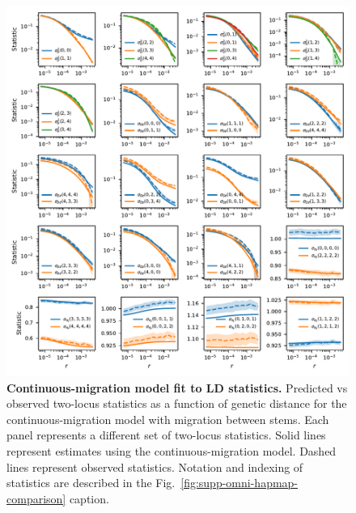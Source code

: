 \documentclass[]{article}
\begin{document}
\begin{figure}[ht]
    \centering
    \includegraphics{figures/supp-continuous-migration-fits.pdf}
    \caption{
        \textbf{Continuous-migration model fit to LD statistics.}
        Predicted vs observed two-locus statistics as a function of genetic
        distance for the continuous-migration model with migration between stems.
        Each panel represents a different
        set of two-locus statistics. Solid lines represent estimates using the
        continuous-migration model. Dashed lines represent observed statistics.
        Notation and indexing of statistics are described in the
        Fig.~\ref{fig:supp-omni-hapmap-comparison} caption.
    }
    \label{fig:supp-continuous-migration-fits}
\end{figure}
\end{document}
